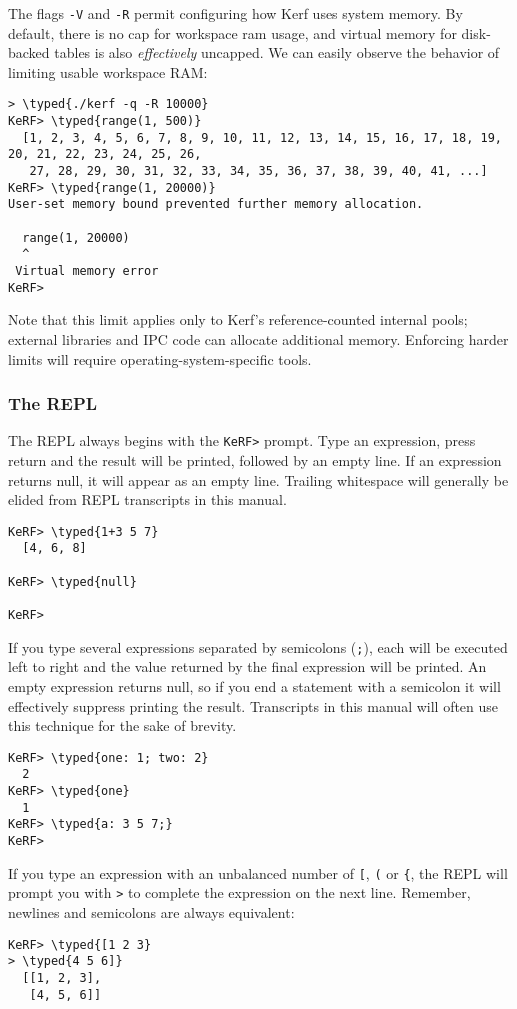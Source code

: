 \documentclass{article}
\newcommand{\typed}[1]{\textcolor{TealBlue}{#1}}
\begin{document}
The flags \texttt{-V} and \texttt{-R} permit configuring how Kerf uses system memory. By default, there is no cap for workspace ram usage, and virtual memory for disk-backed tables is also \emph{effectively} uncapped. We can easily observe the behavior of limiting usable workspace RAM:
\begin{Verbatim}
> \typed{./kerf -q -R 10000}
KeRF> \typed{range(1, 500)}
  [1, 2, 3, 4, 5, 6, 7, 8, 9, 10, 11, 12, 13, 14, 15, 16, 17, 18, 19, 20, 21, 22, 23, 24, 25, 26,
   27, 28, 29, 30, 31, 32, 33, 34, 35, 36, 37, 38, 39, 40, 41, ...]
KeRF> \typed{range(1, 20000)}
User-set memory bound prevented further memory allocation.

  range(1, 20000)
  ^
 Virtual memory error
KeRF>
\end{Verbatim}

Note that this limit applies only to Kerf's reference-counted internal pools; external libraries and IPC code can allocate additional memory. Enforcing harder limits will require operating-system-specific tools.

\subsubsection{The REPL}
The REPL always begins with the \texttt{KeRF>} prompt. Type an expression, press return and the result will be printed, followed by an empty line. If an expression returns null, it will appear as an empty line. Trailing whitespace will generally be elided from REPL transcripts in this manual.

\begin{Verbatim}
KeRF> \typed{1+3 5 7}
  [4, 6, 8]

KeRF> \typed{null}
  
KeRF>
\end{Verbatim}

If you type several expressions separated by semicolons (\texttt{;}), each will be executed left to right and the value returned by the final expression will be printed. An empty expression returns null, so if you end a statement with a semicolon it will effectively suppress printing the result. Transcripts in this manual will often use this technique for the sake of brevity.
\begin{Verbatim}
KeRF> \typed{one: 1; two: 2}
  2
KeRF> \typed{one}
  1
KeRF> \typed{a: 3 5 7;}
KeRF>
\end{Verbatim}

If you type an expression with an unbalanced number of \texttt{[}, \texttt{(} or \texttt{\{}, the REPL will prompt you with \texttt{>} to complete the expression on the next line. Remember, newlines and semicolons are always equivalent:
\begin{Verbatim}
KeRF> \typed{[1 2 3}
> \typed{4 5 6]}
  [[1, 2, 3], 
   [4, 5, 6]]
\end{Verbatim}
\end{document}
